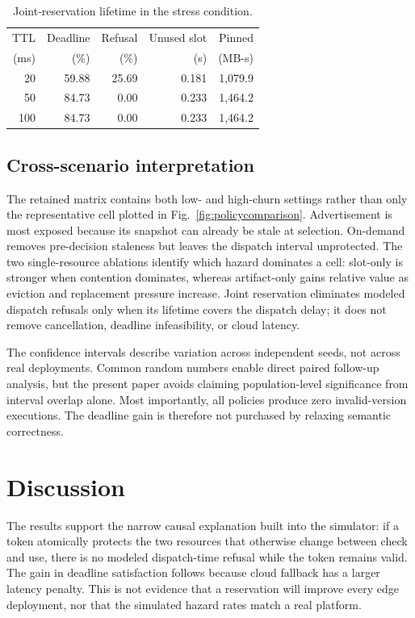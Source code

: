 \documentclass[conference]{IEEEtran}
\begin{document}
\begin{table}[t]
\centering
\caption{Joint-reservation lifetime in the stress condition.}
\label{tab:ttl}
\footnotesize
\begin{tabular}{rrrrr}
\toprule
TTL & Deadline & Refusal & Unused slot & Pinned \\
(ms) & (\%) & (\%) & (s) & (MB-s) \\
\midrule
20 & 59.88 & 25.69 & 0.181 & 1,079.9 \\
50 & 84.73 & 0.00 & 0.233 & 1,464.2 \\
100 & 84.73 & 0.00 & 0.233 & 1,464.2 \\
\bottomrule
\end{tabular}
\end{table}

\subsection{Cross-scenario interpretation}

The retained matrix contains both low- and high-churn settings rather than only the
representative cell plotted in Fig.~\ref{fig:policycomparison}. Advertisement is
most exposed because its snapshot can already be stale at selection. On-demand
removes pre-decision staleness but leaves the dispatch interval unprotected. The
two single-resource ablations identify which hazard dominates a cell: slot-only is
stronger when contention dominates, whereas artifact-only gains relative value as
eviction and replacement pressure increase. Joint reservation eliminates modeled
dispatch refusals only when its lifetime covers the dispatch delay; it does not
remove cancellation, deadline infeasibility, or cloud latency.

The confidence intervals describe variation across independent seeds, not across
real deployments. Common random numbers enable direct paired follow-up analysis,
but the present paper avoids claiming population-level significance from interval
overlap alone. Most importantly, all policies produce zero invalid-version
executions. The deadline gain is therefore not purchased by relaxing semantic
correctness.

\section{Discussion}

The results support the narrow causal explanation built into the simulator: if a token atomically protects the two resources that otherwise change between check and use, there is no modeled dispatch-time refusal while the token remains valid. The gain in deadline satisfaction follows because cloud fallback has a larger latency penalty. This is not evidence that a reservation will improve every edge deployment, nor that the simulated hazard rates match a real platform.
\end{document}
